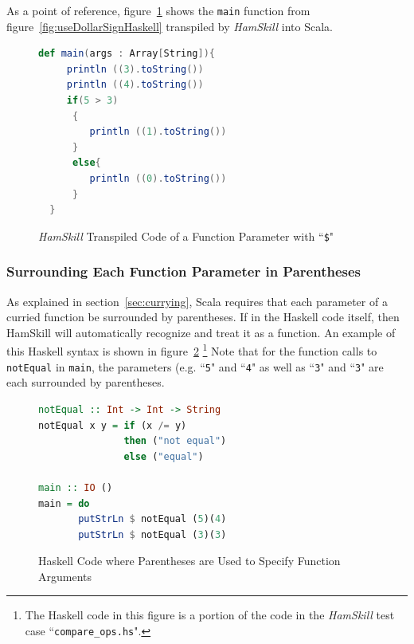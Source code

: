 \documentclass{report}
\begin{document}
As a point of reference, figure~\ref{fig:useDollarSignScala} shows the \texttt{main} function from figure~\ref{fig:useDollarSignHaskell} transpiled by \textit{HamSkill} into Scala.

\begin{figure}[H]
\begin{mdframed}
\begin{lstlisting}[basicstyle=\small, language=scala]
  def main(args : Array[String]){
     println ((3).toString())
     println ((4).toString())
     if(5 > 3)
      {
         println ((1).toString())
      }
      else{
         println ((0).toString())
      }
  } 
\end{lstlisting}
\end{mdframed}
\caption{\textit{HamSkill} Transpiled Code of a Function Parameter with ``\texttt{\$}"}\label{fig:useDollarSignScala}
\end{figure}

\subsubsection{Surrounding Each Function Parameter in Parentheses}

As explained in section~\ref{sec:currying}, Scala requires that each parameter of a curried function be surrounded by parentheses. If in the Haskell code itself, then HamSkill will automatically recognize and treat it as a function.  An example of this Haskell syntax is shown in figure~\ref{fig:haskellFunctionParenthesesFuncArgs} \footnote{The Haskell code in this figure is a portion of the code in the \textit{HamSkill} test case ``\texttt{compare\_ops.hs}".}  Note that for the function calls to \texttt{notEqual} in \texttt{main}, the parameters (e.g. ``\texttt{5}" and ``\texttt{4}" as well as ``\texttt{3}" and ``\texttt{3}" are each surrounded by parentheses.

\begin{figure}[H]
\begin{mdframed}
\begin{lstlisting}[language=Haskell]
notEqual :: Int -> Int -> String
notEqual x y = if (x /= y)
               then ("not equal")
               else ("equal")
               
main :: IO ()
main = do 
       putStrLn $ notEqual (5)(4)
       putStrLn $ notEqual (3)(3)
\end{lstlisting}
\end{mdframed}
\caption{Haskell Code where Parentheses are Used to Specify Function Arguments}\label{fig:haskellFunctionParenthesesFuncArgs}
\end{figure}
\end{document}
